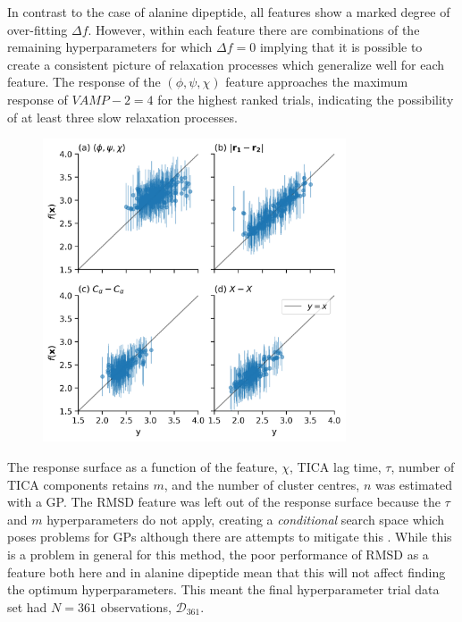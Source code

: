 In contrast to the case of alanine dipeptide, all features show a marked degree of over-fitting $\Delta f$. However, within each feature there are combinations of the remaining hyperparameters for which $\Delta f=0$ implying that it is possible to create a consistent picture of relaxation processes which generalize well for each feature. The response of the $(\phi, \psi, \chi)$ feature  approaches the maximum response of $VAMP-2 = 4$ for the highest ranked trials, indicating the possibility of at least three slow relaxation processes. 

\begin{figure}
    \centering
    \includegraphics[width=0.8\textwidth]{chapters/msm_optimization/figures/aadh_response_surface_fit_d.png}
    
    \label{fig:aadh_rsm_fit}
\end{figure}

The response surface as a function of the feature, $\chi$, TICA lag time, $\tau$, number of TICA components retains $m$, and the number of cluster centres, $n$ was estimated with a GP. The RMSD feature was left out of the response surface because the $\tau$ and $m$ hyperparameters do not apply, creating a \emph{conditional} search space \cite{bergstraAlgorithmsHyperParameterOptimizationa} which  poses problems for GPs although there are attempts to mitigate this \cite{swerskyRaidersLostArchitecture2014}. While this is a problem in general for this method, the poor performance of RMSD as a feature both here and in alanine dipeptide mean that this will not affect finding the optimum hyperparameters. This meant the final hyperparameter trial data set had $N=361$ observations, $\mathcal{D}_{361}$. 

